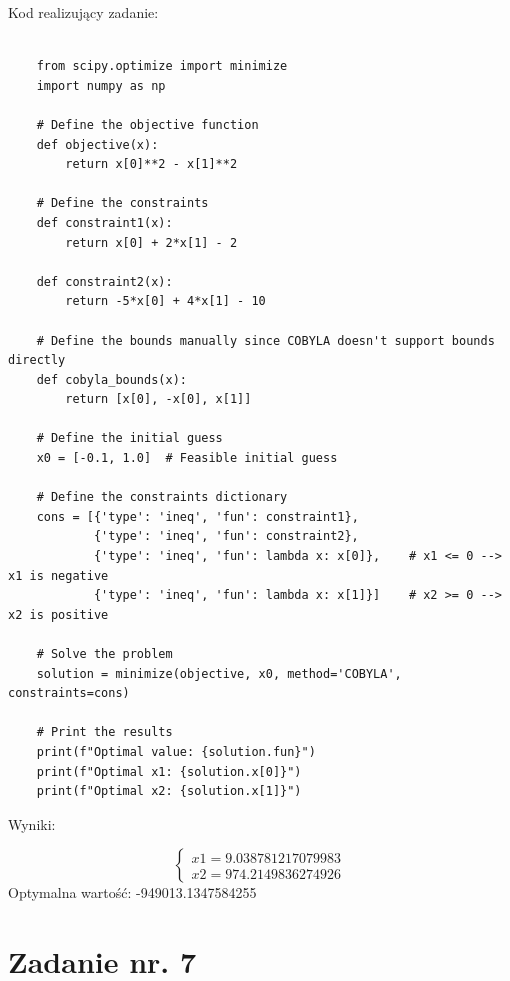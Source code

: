 \documentclass{article}
\begin{document}
Kod realizujący zadanie: 

\begin{lstlisting}
    
    from scipy.optimize import minimize
    import numpy as np
    
    # Define the objective function
    def objective(x):
        return x[0]**2 - x[1]**2
    
    # Define the constraints
    def constraint1(x):
        return x[0] + 2*x[1] - 2
    
    def constraint2(x):
        return -5*x[0] + 4*x[1] - 10
    
    # Define the bounds manually since COBYLA doesn't support bounds directly
    def cobyla_bounds(x):
        return [x[0], -x[0], x[1]]
    
    # Define the initial guess
    x0 = [-0.1, 1.0]  # Feasible initial guess
    
    # Define the constraints dictionary
    cons = [{'type': 'ineq', 'fun': constraint1},
            {'type': 'ineq', 'fun': constraint2},
            {'type': 'ineq', 'fun': lambda x: x[0]},    # x1 <= 0 --> x1 is negative
            {'type': 'ineq', 'fun': lambda x: x[1]}]    # x2 >= 0 --> x2 is positive
    
    # Solve the problem
    solution = minimize(objective, x0, method='COBYLA', constraints=cons)
    
    # Print the results
    print(f"Optimal value: {solution.fun}")
    print(f"Optimal x1: {solution.x[0]}")
    print(f"Optimal x2: {solution.x[1]}")

\end{lstlisting}

Wyniki:

\begin{equation}
    \begin{cases}
        x1=9.038781217079983\\
        x2=974.2149836274926
    \end{cases}
\end{equation}
Optymalna wartość: -949013.1347584255
\section{Zadanie nr. 7}
\end{document}
